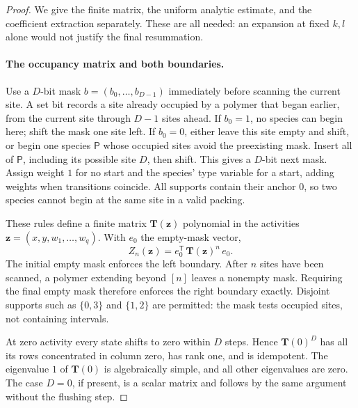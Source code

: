 \documentclass[11pt]{article}
\numberwithin{equation}{section}
\theoremstyle{definition}
\theoremstyle{remark}
\theoremstyle{definition}
\begin{document}
\begin{proof}
We give the finite matrix, the uniform analytic estimate, and the
coefficient extraction separately. These are all needed: an expansion at
fixed $k,l$ alone would not justify the final resummation.

\paragraph{The occupancy matrix and both boundaries.}
Use a $D$-bit mask $b=(b_0,\ldots,b_{D-1})$ immediately before scanning the
current site. A set bit records a site already occupied by a polymer that
began earlier, from the current site through $D-1$ sites ahead. If $b_0=1$,
no species can begin here; shift the mask one site left. If $b_0=0$, either
leave this site empty and shift, or begin one species $\mathsf P$ whose
occupied sites avoid the preexisting mask. Insert all of $\mathsf P$,
including its possible site $D$, then shift. This gives a $D$-bit next mask.
Assign weight $1$ for no start and the species' type variable for a start,
adding weights when transitions coincide. All supports contain their anchor
$0$, so two species cannot begin at the same site in a valid packing.

These rules define a finite matrix $\mathbf T(\boldsymbol z)$ polynomial in
the activities $\boldsymbol z=(x,y,w_1,\ldots,w_q)$. With $e_0$ the
empty-mask vector,
\begin{equation}
 Z_n(\boldsymbol z)=e_0^{\mathsf T}\,\mathbf T(\boldsymbol z)^n\,e_0.
 \label{spf:cg:eq:transfer}
\end{equation}
The initial empty mask enforces the left boundary. After $n$ sites have
been scanned, a polymer extending beyond $[n]$ leaves a nonempty mask.
Requiring the final empty mask therefore enforces the right boundary
exactly. Disjoint supports such as $\{0,3\}$ and $\{1,2\}$ are permitted:
the mask tests occupied sites, not containing intervals.

At zero activity every state shifts to zero within $D$ steps. Hence
$\mathbf T(0)^D$ has all its rows concentrated in column zero, has rank one,
and is idempotent. The eigenvalue $1$ of $\mathbf T(0)$ is algebraically
simple, and all other eigenvalues are zero. The case $D=0$, if present, is a
scalar matrix and follows by the same argument without the flushing step.


\end{proof}
\end{document}
